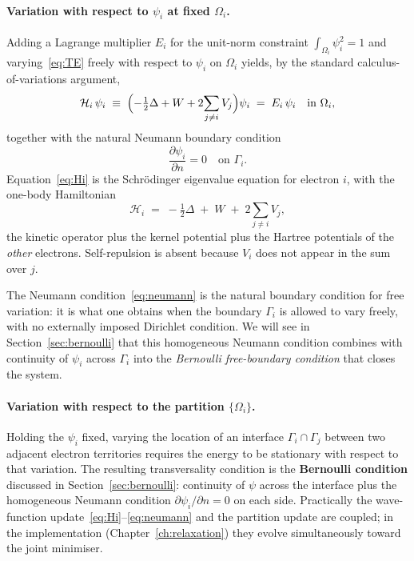 \paragraph{Variation with respect to $\psi_i$ at fixed $\Omega_i$.} Adding a Lagrange multiplier $E_i$ for the unit-norm constraint $\int_{\Omega_i} \psi_i^2 = 1$ and varying~\eqref{eq:TE} freely with respect to $\psi_i$ on $\Omega_i$ yields, by the standard calculus-of-variations argument,
\begin{equation}\label{eq:Hi}
\mathcal{H}_i\, \psi_i \;\equiv\; \Bigl(-\tfrac{1}{2}\Delta + W + 2\!\sum_{j \ne i} V_j\Bigr) \psi_i \;=\; E_i\, \psi_i \quad \text{in } \Omega_i,
\end{equation}
together with the natural Neumann boundary condition
\begin{equation}\label{eq:neumann}
\frac{\partial \psi_i}{\partial n} = 0 \quad \text{on } \Gamma_i.
\end{equation}
Equation~\eqref{eq:Hi} is the Schr\"odinger eigenvalue equation for electron $i$, with the one-body Hamiltonian
\begin{equation}\label{eq:Hi-def}
\mathcal{H}_i \;=\; -\tfrac{1}{2}\Delta \;+\; W \;+\; 2 \sum_{j \ne i} V_j,
\end{equation}
the kinetic operator plus the kernel potential plus the Hartree potentials of the \emph{other} electrons. Self-repulsion is absent because $V_i$ does not appear in the sum over $j$.

The Neumann condition~\eqref{eq:neumann} is the natural boundary condition for free variation: it is what one obtains when the boundary $\Gamma_i$ is allowed to vary freely, with no externally imposed Dirichlet condition. We will see in Section~\ref{sec:bernoulli} that this homogeneous Neumann condition combines with continuity of $\psi_i$ across $\Gamma_i$ into the \emph{Bernoulli free-boundary condition} that closes the system.

\paragraph{Variation with respect to the partition $\{\Omega_i\}$.} Holding the $\psi_i$ fixed, varying the location of an interface $\Gamma_i \cap \Gamma_j$ between two adjacent electron territories requires the energy to be stationary with respect to that variation. The resulting transversality condition is the \textbf{Bernoulli condition} discussed in Section~\ref{sec:bernoulli}: continuity of $\psi$ across the interface plus the homogeneous Neumann condition $\partial\psi_i/\partial n = 0$ on each side. Practically the wave-function update~\eqref{eq:Hi}--\eqref{eq:neumann} and the partition update are coupled; in the implementation (Chapter~\ref{ch:relaxation}) they evolve simultaneously toward the joint minimiser.

